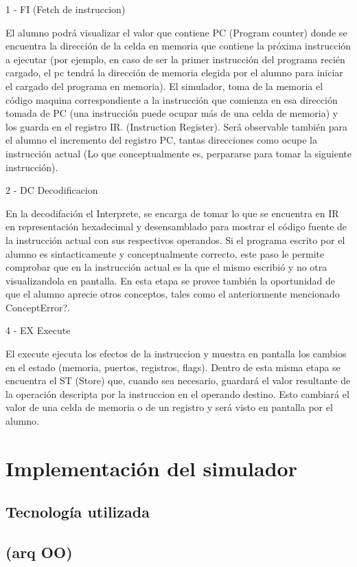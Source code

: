 1 - FI (Fetch de instruccion)

El alumno podrá visualizar el valor que contiene PC (Program counter) donde se encuentra la dirección de la celda en memoria que contiene la próxima instrucción a ejecutar (por ejemplo, en caso de ser la primer instrucción del programa recién cargado, el pc tendrá la dirección de memoria elegida por el alumno para iniciar el cargado del programa en memoria). El simulador, toma de la memoria el código maquina correspondiente a la instrucción que comienza en esa dirección tomada de PC (una instrucción puede ocupar más de una celda de memoria) y los guarda en el registro IR. (Instruction Register). Será observable también para el alumno el incremento del registro PC, tantas direcciones como ocupe la instrucción actual (Lo que conceptualmente es, perpararse para tomar la siguiente instrucción).

2 - DC Decodificacion

En la decodifación el Interprete, se encarga de tomar lo que se encuentra en IR en representación hexadecimal y desensamblado para mostrar el código fuente de la instrucción actual con sus respectivos operandos. Si el programa escrito por el alumno es sintacticamente y conceptualmente correcto, este paso le permite comprobar que en la instrucción actual es la que el mismo escribió y no otra visualizandola en pantalla. En esta etapa se provee también la oportunidad de que el alumno aprecie otros conceptos, tales como el anteriormente mencionado ConceptError?.

4 - EX Execute

El execute ejecuta los efectos de la instruccion y muestra en pantalla los cambios en el estado (memoria, puertos, registros, flags). Dentro de esta misma etapa se encuentra el ST (Store) que, cuando sea necesario, guardará el valor resultante de la operación descripta por la instruccion en el operando destino. Esto cambiará el valor de una celda de memoria o de un registro y será visto en pantalla por el alumno.

\section{Implementación del simulador}
\subsection{Tecnología utilizada}
\subsection{ (arq OO)}



